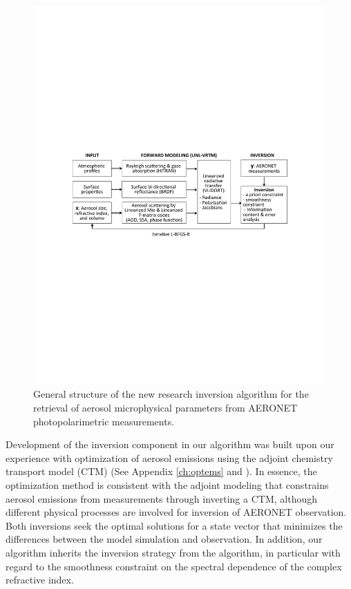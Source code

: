 \begin{figure}[t]
  \centering
  \includegraphics[width={\textwidth}]{figures/algorithm.pdf}
  \caption[General structure of the new research inversion algorithm.]
{General structure of the new research inversion algorithm for
the retrieval of aerosol microphysical parameters from AERONET
photopolarimetric measurements.}
  \label{fig:alg}
\end{figure}

Development of the inversion component in our algorithm was built upon
our experience with optimization of aerosol emissions using the adjoint
chemistry transport model (CTM) (See Appendix \ref{ch:optems} 
and \citep{Wang12, Xu13}). In essence, the optimization method is 
consistent with the adjoint modeling \citep[e.g.,][]{Henze07}
that constrains aerosol emissions from measurements through inverting a
CTM, although different physical processes are involved for inversion of
AERONET observation. Both inversions seek the optimal solutions for a
state vector that minimizes the differences between the model simulation
and observation. In addition, our algorithm inherits the inversion
strategy from the \Dub algorithm, in particular with regard to
the smoothness constraint on the spectral dependence of the complex
refractive index.

